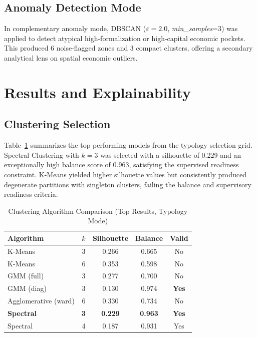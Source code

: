 \documentclass[conference]{IEEEtran}
\begin{document}
\subsection{Anomaly Detection Mode}
\label{sec:anomaly}

In complementary anomaly mode, DBSCAN ($\varepsilon=2.0$,
\textit{min\_samples}=3) was applied to detect atypical
high-formalization or high-capital economic pockets.
This produced 6 noise-flagged zones and 3 compact clusters,
offering a secondary analytical lens on spatial economic outliers.

\section{Results and Explainability}
\label{sec:results}

\subsection{Clustering Selection}

Table~\ref{tab:clustering} summarizes the top-performing models
from the typology selection grid. Spectral Clustering with $k=3$
was selected with a silhouette of 0.229 and an exceptionally high
balance score of 0.963, satisfying the supervised readiness constraint.
K-Means yielded higher silhouette values but consistently produced
degenerate partitions with singleton clusters, failing the balance
and supervisory readiness criteria.

\begin{table}[htbp]
\caption{Clustering Algorithm Comparison (Top Results, Typology Mode)}
\label{tab:clustering}
\begin{center}
\begin{tabular}{|l|c|c|c|c|}
\hline
\textbf{Algorithm} & \textbf{$k$} & \textbf{Silhouette} & \textbf{Balance} & \textbf{Valid} \\
\hline
K-Means          & 3 & 0.266 & 0.665 & No \\
K-Means          & 6 & 0.353 & 0.598 & No \\
GMM (full)       & 3 & 0.277 & 0.700 & No \\
GMM (diag)       & 3 & 0.130 & 0.974 & \textbf{Yes} \\
Agglomerative (ward) & 6 & 0.330 & 0.734 & No \\
\textbf{Spectral}& \textbf{3} & \textbf{0.229} & \textbf{0.963} & \textbf{Yes} \\
Spectral         & 4 & 0.187 & 0.931 & Yes \\
\hline
\end{tabular}
\end{center}
\end{table}
\end{document}
